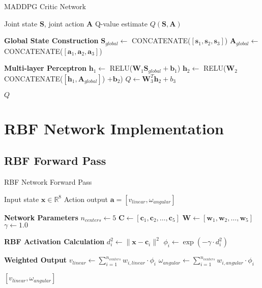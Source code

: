 \documentclass[11pt,a4paper]{article}
\newcommand{\vect}[1]{\boldsymbol{#1}}
\newcommand{\Real}{\mathbb{R}}
\begin{document}
\begin{algorithm}[H]
\caption{MADDPG Critic Network}
\label{alg:critic}
\begin{algorithmic}[1]
\Require Joint state $\vect{S}$, joint action $\vect{A}$
\Ensure Q-value estimate $Q(\vect{S}, \vect{A})$

\State \textbf{Global State Construction}
\State $\vect{S}_{global} \leftarrow$ CONCATENATE($[\vect{s}_1, \vect{s}_2, \vect{s}_3]$)
\State $\vect{A}_{global} \leftarrow$ CONCATENATE($[\vect{a}_1, \vect{a}_2, \vect{a}_3]$)

\State \textbf{Multi-layer Perceptron}
\State $\vect{h}_1 \leftarrow$ RELU($\vect{W}_1 \vect{S}_{global} + \vect{b}_1$)
\State $\vect{h}_2 \leftarrow$ RELU($\vect{W}_2$ CONCATENATE($[\vect{h}_1, \vect{A}_{global}]$) $+ \vect{b}_2$)
\State $Q \leftarrow \vect{W}_3^T \vect{h}_2 + b_3$

\Return $Q$
\end{algorithmic}
\end{algorithm}

\section{RBF Network Implementation}

\subsection{RBF Forward Pass}

\begin{algorithm}[H]
\caption{RBF Network Forward Pass}
\label{alg:rbf_forward}
\begin{algorithmic}[1]
\Require Input state $\vect{x} \in \Real^8$
\Ensure Action output $\vect{a} = [v_{linear}, \omega_{angular}]$

\State \textbf{Network Parameters}
\State $n_{centers} \leftarrow 5$
\State $\vect{C} \leftarrow [\vect{c}_1, \vect{c}_2, \ldots, \vect{c}_5]$ 
\State $\vect{W} \leftarrow [\vect{w}_1, \vect{w}_2, \ldots, \vect{w}_5]$ 
\State $\gamma \leftarrow 1.0$ 

\State \textbf{RBF Activation Calculation}
    \State $d_i^2 \leftarrow \|\vect{x} - \vect{c}_i\|^2$
    \State $\phi_i \leftarrow \exp(-\gamma \cdot d_i^2)$
\EndFor

\State \textbf{Weighted Output}
\State $v_{linear} \leftarrow \sum_{i=1}^{n_{centers}} w_{i,linear} \cdot \phi_i$
\State $\omega_{angular} \leftarrow \sum_{i=1}^{n_{centers}} w_{i,angular} \cdot \phi_i$

\Return $[v_{linear}, \omega_{angular}]$
\end{algorithmic}
\end{algorithm}
\end{document}
